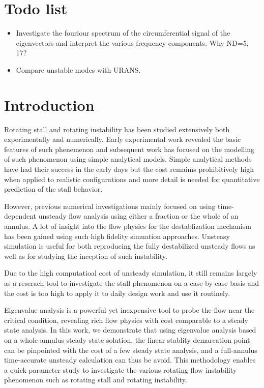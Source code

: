 \documentclass[journal,final]{new-aiaa}
\begin{document}
\section{{\color{red}Todo list}}

\begin{itemize}
	\item  {\color{red} Investigate the fouriour spectrum
		of the circumferential signal of the eigenvectors and
		interpret the various frequency components. Why ND=5, 17?}
	\item {\color{red} Compare unstable modes with URANS.}
\end{itemize}


\section{Introduction}
Rotating stall and rotating instability has been studied extensively
both experimentally and numerically. Early experimental work revealed
the basic features of such phenemenon and subsequent work has focused
on the modelling of such phenomenon using simple analytical models.
Simple analytical methods have had their success in the early days
but the cost remaims prohibitively high when applied to realistic configurations and
more detail is needed for quantitative prediction of the stall behavior.

However, previous numerical
investigations mainly focused on using time-dependent unsteady
flow analysis using either a fraction or the whole of an annulus.
A lot of insight into the flow physics for the destablization mechanism
has been gained using such high fidelity simuation approaches.
Unsteasy simulation is useful for both reproducing the fully
destabilized unsteady flows as well as for studying the inception
of such instability.

Due to the high computatioal cost of unsteady simulation, it still remains
largely as a reserach tool to investigate the stall phenomenon on a
case-by-case basis and the cost is too high to apply it to daily
design work and use it routinely.

Eigenvalue analysis is a powerful yet inexpensive tool to probe the flow
near the critical condition, revealing rich flow physics with cost comparable
to a steady state analysis. In this work, we demonstrate that using eigenvalue
analysis based on a whole-annulus steady state solution, the linear stablity
demarcation point can be pinpointed with the cost of a few steady state
analysis, and a full-annulus time-accurate unsteady calculation
can thus be avoid. This methodology enables a quick parameter
study to investigate the various rotating flow instability phenomenon
such as rotating stall and rotating instability.
\end{document}
